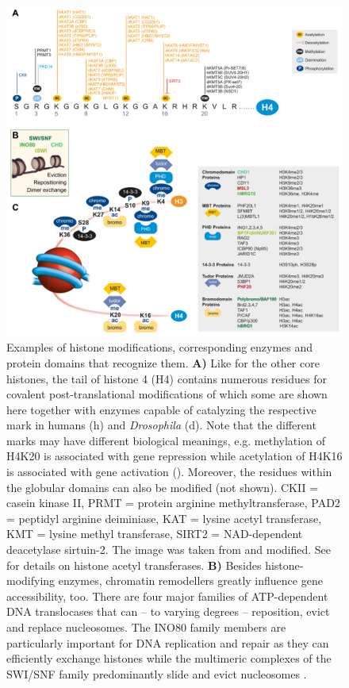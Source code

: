 \begin{figure}
\includegraphics[width=1\textwidth]{Figures/histonesExtended.pdf}
\begin{footnotesize}
\caption[Exemplary histone modifications, their enzymes and histone-modification-recognizing protein domains.]{\textsf{Examples of histone modifications, corresponding enzymes and protein domains that recognize them.
\textbf{A)} Like for the other core histones, the tail of histone 4 (H4) contains numerous residues for covalent post-translational modifications of which some are shown here together with enzymes capable of catalyzing the respective mark in humans (h) and \textit{Drosophila} (d). Note that the different marks may have different biological meanings, e.g. methylation of H4K20 is associated with gene repression while acetylation of H4K16 is associated with gene activation (). Moreover, the residues within the globular domains can also be modified (not shown). CKII = casein kinase II, PRMT = protein arginine methyltransferase, PAD2 = peptidyl arginine deiminiase, KAT = lysine acetyl transferase, KMT = lysine methyl transferase, SIRT2 = NAD-dependent deacetylase sirtuin-2. The image was taken from \citep{Abcam} and modified. See  for details on histone acetyl transferases.
\textbf{B)} Besides histone-modifying enzymes, chromatin remodellers greatly influence gene accessibility, too. There are four major families of ATP-dependent DNA translocases that can -- to varying degrees -- reposition, evict and replace nucleosomes. The INO80 family members are particularly important for DNA replication and repair as they can efficiently exchange histones while the multimeric complexes of the SWI/SNF family predominantly slide and evict nucleosomes \citep{Manelyte2013}.
}}
\end{footnotesize}
\end{figure}
